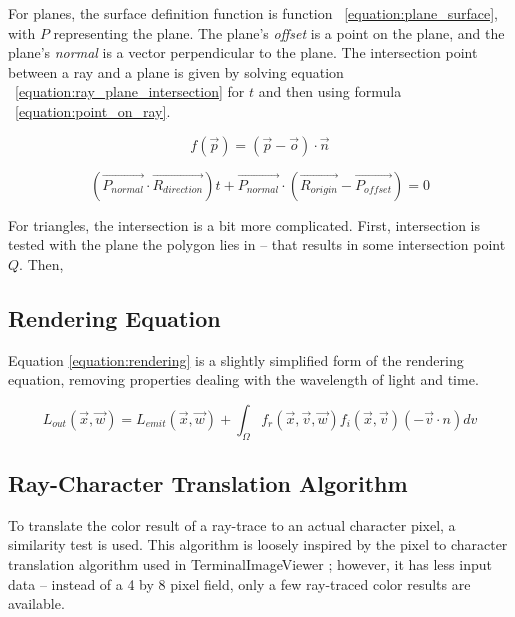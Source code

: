 \documentclass[11pt]{article}
\newcommand{\rayorg}{\vec{R_{origin}}}
\newcommand{\raydir}{\vec{R_{direction}}}
\begin{document}
For planes, the surface definition function is function ~\ref{equation:plane_surface}, with $P$ representing the plane.
The plane's {\it offset} is a point on the plane, and the plane's {\it normal} is a vector perpendicular to the plane.
The intersection point between a ray and a plane is given by solving equation ~\ref{equation:ray_plane_intersection} for $t$ and then using formula ~\ref{equation:point_on_ray}.

\begin{equation}
  \label{equation:plane_surface}
  f(\vec{p}) = (\vec{p} - \vec{o}) \cdot \vec{n}
\end{equation}

\begin{equation}
  \label{equation:ray_plane_intersection}
  (\vec{P_{normal}} \cdot \raydir)t + \vec{P_{normal}} \cdot (\rayorg - \vec{P_{offset}}) = 0
\end{equation}

For triangles, the intersection is a bit more complicated. First, intersection is tested with the plane the polygon lies in -- that results in some intersection point $Q$. Then,


\subsection{Rendering Equation}
\label{sec:method:rendering_equation}
Equation \ref{equation:rendering} is a slightly simplified form of the rendering equation, removing properties dealing with the wavelength of light and time.

\begin{equation}
  \label{equation:rendering}
  L_{out}(\vec{x}, \vec{w}) = L_{emit}(\vec{x}, \vec{w}) + \int_{\Omega} f_r(\vec{x}, \vec{v},\vec{w})f_i(\vec{x}, \vec{v})(-\vec{v} \cdot n) dv
\end{equation}

\subsection{Ray-Character Translation Algorithm}
\label{sec:method:ray_character_algorithm}

To translate the color result of a ray-trace to an actual character pixel, a similarity test is used. This algorithm is loosely inspired by the pixel to character translation algorithm used in TerminalImageViewer \cite{tivGithub}; however, it has less input data -- instead of a 4 by 8 pixel field, only a few ray-traced color results are available.
\end{document}
